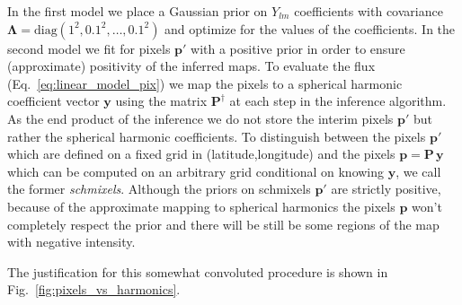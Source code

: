 \documentclass[modern]{aastex62}
\begin{document}
In the first model we place a Gaussian prior on $Y_{lm}$ coefficients with covariance $\boldsymbol{\Lambda}=\mathrm{diag}(1^2,0.1^2,\dots,0.1^2)$ and optimize for the values of the coefficients. 
In the second model we fit for pixels $\mathbf{p}'$ with a positive prior  in order to ensure (approximate) positivity of the inferred maps.
To evaluate the flux (Eq.~\ref{eq:linear_model_pix}) we map the pixels to a spherical harmonic coefficient vector $\mathbf{y}$ using the matrix $\mathbf{P}^\dagger$ at each step in the inference algorithm.
As the end product of the inference we do not store the interim pixels $\mathbf{p}'$ but rather the spherical harmonic coefficients. 
To distinguish between the pixels $\mathbf{p}'$ which are defined on a fixed grid in (latitude,longitude) and the pixels $\mathbf{p}=\mathbf{P}\,\mathbf{y}$ which can be computed on an arbitrary grid conditional on knowing $\mathbf{y}$, we call the former \emph{schmixels}.
Although the priors on schmixels $\mathbf{p}'$ are strictly positive, because of the approximate mapping to spherical harmonics the pixels $\mathbf{p}$ won't completely respect the prior and there will be still be some regions of the map with negative intensity.

The justification for this somewhat convoluted procedure is shown in Fig.~\ref{fig:pixels_vs_harmonics}.
\end{document}
